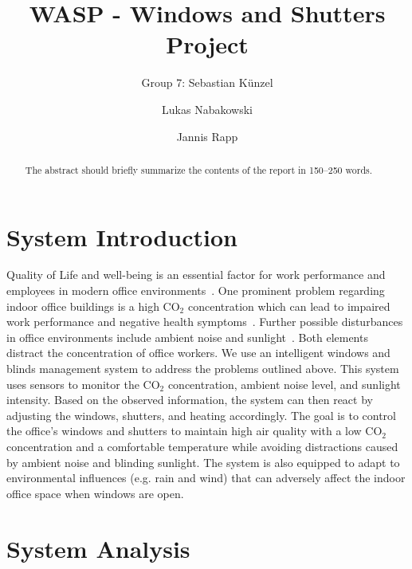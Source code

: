 \documentclass[runningheads]{llncs}
\begin{document}
%
\title{WASP - Windows and Shutters Project}

\author{Group 7: Sebastian Künzel \and
Lukas Nabakowski \and
Jannis Rapp}

%
\maketitle              %
%
\begin{abstract}
The abstract should briefly summarize the contents of the report in
150--250 words. 

\end{abstract}
%
%
%
\section{System Introduction}

Quality of Life and well-being is an essential factor for work performance and employees in modern office environments~\cite{employee_wellbeingimportant}. One prominent problem regarding indoor office buildings is a high CO$_2$ concentration which can lead to impaired work performance and negative health symptoms~\cite{indoor_polutionCO2}. Further possible disturbances in office environments include ambient noise and sunlight~\cite{indoor_noiselight}. Both elements distract the concentration of office workers. 
\newline
We use an intelligent windows and blinds management system to address the problems outlined above.
This system uses sensors to monitor the CO$_2$ concentration, ambient noise level, and sunlight intensity.
Based on the observed information, the system can then react by adjusting the windows, shutters, and heating accordingly.
\newline
The goal is to control the office's windows and shutters to maintain high air quality with a low CO$_2$ concentration and a comfortable temperature while avoiding distractions caused by ambient noise and blinding sunlight. The system is also equipped to adapt to environmental influences (e.g. rain and wind) that can adversely affect the indoor office space when windows are open.   



\section{System Analysis}
\end{document}
